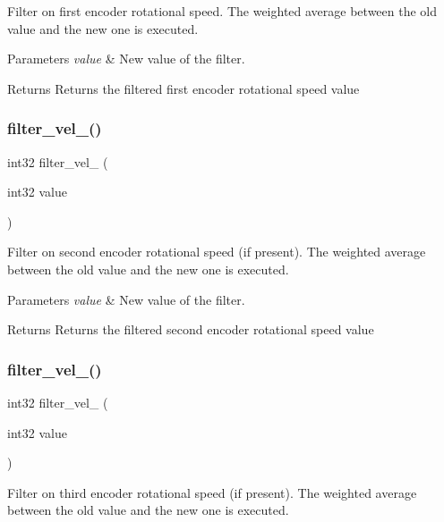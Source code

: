 Filter on first encoder rotational speed. The weighted average between the old value and the new one is executed.


\begin{DoxyParams}{Parameters}
{\em value} & New value of the filter.\\
\hline
\end{DoxyParams}
\begin{DoxyReturn}{Returns}
Returns the filtered first encoder rotational speed value 
\end{DoxyReturn}
\mbox{\label{utils_8h_abda54d76e676bb1cb27b5577bd0fe099}} 
\subsubsection{filter\+\_\+vel\+\_()}
{\footnotesize\ttfamily int32 filter\+\_\+vel\+\_ (\begin{DoxyParamCaption}\item[{int32}]{value }\end{DoxyParamCaption})}

Filter on second encoder rotational speed (if present). The weighted average between the old value and the new one is executed.


\begin{DoxyParams}{Parameters}
{\em value} & New value of the filter.\\
\hline
\end{DoxyParams}
\begin{DoxyReturn}{Returns}
Returns the filtered second encoder rotational speed value 
\end{DoxyReturn}
\mbox{\label{utils_8h_a70430ee90ed28e4c9fca0c4ca3d6583e}} 
\subsubsection{filter\+\_\+vel\+\_()}
{\footnotesize\ttfamily int32 filter\+\_\+vel\+\_ (\begin{DoxyParamCaption}\item[{int32}]{value }\end{DoxyParamCaption})}

Filter on third encoder rotational speed (if present). The weighted average between the old value and the new one is executed.


